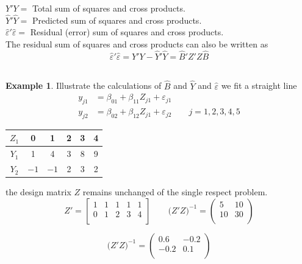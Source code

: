 \documentclass[11pt,a4paper]{article}
\theoremstyle{definition}
\newtheorem{exa}[thm]{Example}
\begin{document}
$Y'Y=$ Total sum of squares and cross products.\\

$\widehat{Y}'\widehat{Y}=$ Predicted sum of squares and cross products.\\

$\widehat{\varepsilon}'\widehat{\varepsilon} =$ Residual (error) sum of squares and cross products.\\


The residual sum of squares and cross products can also be written as \begin{equation}\tag{10}
\widehat{\varepsilon}'\widehat{\varepsilon} = Y'Y-\widehat{Y}'\widehat{Y}= \widehat{B}'Z'Z\widehat{B}
\end{equation}\\

\begin{exa}
Illustrate the calculations of $\widehat{B}$ and $\widehat{Y}$ and $\widehat{\varepsilon}$ we fit a straight line
\begin{align*}
y_{j1} & = \beta_{01} + \beta_{11}Z_{j1} + \varepsilon_{j1}\\
y_{j2} & = \beta_{02} + \beta_{12}Z_{j1} + \varepsilon_{j2}\qquad j=1,2,3,4,5
\end{align*}
\end{exa}



\begin{table}[H]
\centering
\begin{tabular}{c|ccccc}
$Z_1$ & 0 & 1 & 2 & 3 & 4\\
\hline
$Y_1$ & 1 & 4 & 3 & 8 & 9\\
$Y_2$ & $-1$ & $-1$ & 2 & 3 & 2\\
\end{tabular}
\end{table}


the design matrix $Z$ remains unchanged of the single respect problem.
$$ Z' =
\begin{bmatrix}
1 & 1 & 1 & 1 & 1\\
0 & 1 & 2 & 3 & 4\\
\end{bmatrix}
\qquad 
\big(Z'Z\big)^{-1}=
\begin{pmatrix}
5 & 10\\
10 & 30\\
\end{pmatrix}
$$



$$\big(Z'Z\big)^{-1} = 
\begin{pmatrix}
0.6 & -0.2\\
-0.2 & 0.1\\
\end{pmatrix}
$$\\
\end{document}
